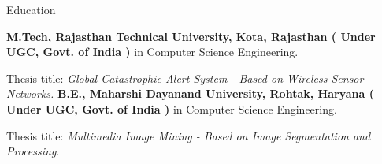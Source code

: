 \begin{rubric}{Education}

\entry*[2009 -- 2011]%
	\textbf{M.Tech, Rajasthan Technical University, Kota, Rajasthan ( Under UGC, Govt. of India )} in Computer Science Engineering.
	\par Thesis title: \emph{Global Catastrophic Alert System - Based on Wireless Sensor Networks.}
%
\entry*[2005 -- 2009]%
	\textbf{B.E., Maharshi Dayanand University, Rohtak, Haryana ( Under UGC, Govt. of India )} in Computer Science Engineering.\par
	Thesis title: \emph{Multimedia Image Mining - Based on Image Segmentation and Processing}.
\end{rubric}